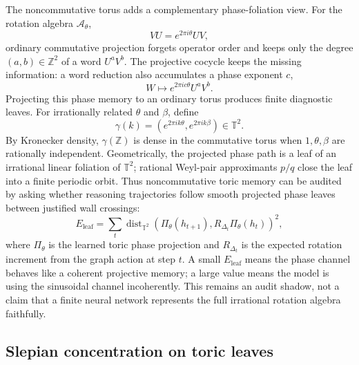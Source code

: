 \documentclass[11pt]{article}
\theoremstyle{definition}
\theoremstyle{plain}
\theoremstyle{remark}
\numberwithin{equation}{section}
\newcommand{\Z}{\mathbb{Z}}
\newcommand{\A}{\mathcal{A}}
\newcommand{\dist}{\operatorname{dist}}
\begin{document}
The noncommutative torus adds a complementary phase-foliation view.  For the rotation algebra $\A_\theta$,
\begin{equation}
  VU=e^{2\pi i\theta}UV,
\end{equation}
ordinary commutative projection forgets operator order and keeps only the degree $(a,b)\in\Z^2$ of a word $U^aV^b$.  The projective cocycle keeps the missing information: a word reduction also accumulates a phase exponent $c$,
\begin{equation}
  W\mapsto e^{2\pi i c\theta}U^aV^b.
\end{equation}
Projecting this phase memory to an ordinary torus produces finite diagnostic leaves.  For irrationally related $\theta$ and $\beta$, define
\begin{equation}
  \gamma(k)=\left(e^{2\pi i k\theta},e^{2\pi i k\beta}\right)\in\mathbb T^2.
\end{equation}
By Kronecker density, $\gamma(\Z)$ is dense in the commutative torus when $1,\theta,\beta$ are rationally independent.  Geometrically, the projected phase path is a leaf of an irrational linear foliation of $\mathbb T^2$; rational Weyl-pair approximants $p/q$ close the leaf into a finite periodic orbit.  Thus noncommutative toric memory can be audited by asking whether reasoning trajectories follow smooth projected phase leaves between justified wall crossings:
\begin{equation}
  E_{\mathrm{leaf}}=\sum_t
  \dist_{\mathbb T^2}\!\left(\Pi_\theta(h_{t+1}),
  R_{\Delta_t}\Pi_\theta(h_t)\right)^2,
\end{equation}
where $\Pi_\theta$ is the learned toric phase projection and $R_{\Delta_t}$ is the expected rotation increment from the graph action at step $t$.  A small $E_{\mathrm{leaf}}$ means the phase channel behaves like a coherent projective memory; a large value means the model is using the sinusoidal channel incoherently.  This remains an audit shadow, not a claim that a finite neural network represents the full irrational rotation algebra faithfully.

\subsection{Slepian concentration on toric leaves}
\end{document}
